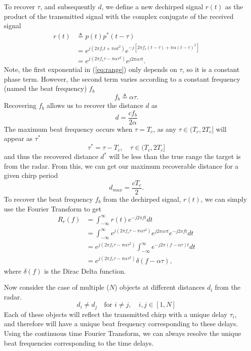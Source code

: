 To recover $\tau$, and subsequently $d$, we define a new dechirped signal $r(t)$
as the product of the transmitted signal with the complex conjugate of the
received signal
\begin{align}
	r(t) &\triangleq p(t)p^*(t-\tau) \\
	&= e^{j(2\pi f_c t + \pi \alpha t^2)}e^{-j[2\pi f_c (t-\tau) + \pi\alpha (t-\tau)^2 ]} \\
	&= e^{j(2\pi f_c \tau - \pi \alpha \tau^2)}e^{j2\pi\alpha\tau t}.\label{eq:range}
\end{align}
Note, the first exponential in (\ref{eq:range}) only depends on $\tau$, so it is
a constant phase term. However, the second term varies according to a constant
frequency (named the beat frequency) $f_b$
\begin{equation}
	f_b \triangleq \alpha \tau.
\end{equation}
Recovering $f_b$ allows us to recover the distance $d$ as
\begin{equation}
	\label{eq:distance}
	d = \frac{c f_b}{2\alpha}
\end{equation}
The maximum beat frequency occurs when $\tau = T_c$, as any $\tau \in (T_c, 2T_c]$ will
appear as $\tau^*$
\begin{equation}
	\tau^* = \tau - T_c, \quad \tau \in (T_c, 2T_c]
\end{equation}
and thus the recovered distance $d^*$ will be less than the true range the
target is from the radar. From this, we can get our maximum recoverable distance
for a given chirp period
\begin{equation}
	d_{max} = \frac{c T_c}{2}.
\end{equation}
To recover the beat frequency $f_b$ from the dechirped signal, $r(t)$, we can
simply use the Fourier Transform to get
\begin{align}
	R_r(f) &= \int_{-\infty}^{\infty} r(t) e^{-j2 \pi ft} dt \label{eq:range-ft}\\
	&= \int_{-\infty}^{\infty} e^{j(2\pi f_c \tau - \pi \alpha \tau^2)}e^{j2\pi\alpha\tau t} e^{-j2\pi ft}dt\\
	&= e^{j(2\pi f_c \tau - \pi \alpha
	\tau^2)}\int_{-\infty}^{\infty}e^{-j2\pi(f - \alpha\tau ) t} dt\\
	&= e^{j(2\pi f_c \tau - \pi \alpha \tau^2)}\delta (f - \alpha \tau),
\end{align}
where $\delta(f)$ is the Dirac Delta function.

Now consider the case of multiple ($N$) objects at different distances $d_i$ from the radar.
\begin{equation}
	d_i \not = d_j \quad \text{for } i \not = j, \quad i,j \in [1, N]
\end{equation}
Each of these objects will reflect the transmitted chirp with a unique delay
$\tau_i$, and therefore will have a unique beat frequency corresponding to these
delays. Using the continuous time Fourier Transform, we can always resolve the
unique beat frequencies corresponding to the time delays. 


